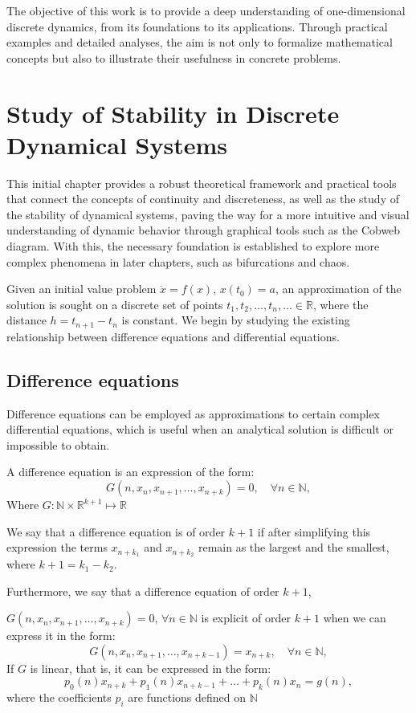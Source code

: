 \documentclass[12pt,a4paper]{report}
\theoremstyle{definition}
\begin{document}
The objective of this work is to provide a deep understanding of one-dimensional discrete dynamics, from its foundations to its applications. Through practical examples and detailed analyses, the aim is not only to formalize mathematical concepts but also to illustrate their usefulness in concrete problems.

\chapter{Study of Stability in Discrete Dynamical Systems}\label{chap:dinamica_discreta}

This initial chapter provides a robust theoretical framework and practical tools that connect the concepts of continuity and discreteness, as well as the study of the stability of dynamical systems, paving the way for a more intuitive and visual understanding of dynamic behavior through graphical tools such as the Cobweb diagram. With this, the necessary foundation is established to explore more complex phenomena in later chapters, such as bifurcations and chaos.

Given an initial value problem \(\dot{x} = f(x)\), \(x(t_0) = a\), an approximation of the solution is sought on a discrete set of points \(t_1, t_2, \ldots, t_n, \ldots \in \mathbb{R}\), where the distance \(h = t_{n+1} - t_n\) is constant. We begin by studying the existing relationship between difference equations and differential equations. 

\section{Difference equations}
 
Difference equations can be employed as approximations to certain complex differential equations, which is useful when an analytical solution is difficult or impossible to obtain.

A difference equation is an expression of the form:
\[
G(n, x_n,x_{n+1}, \ldots, x_{n+k}) = 0, \quad \forall n \in \mathbb{N},
\]
%
Where  $G:\mathbb{N} \times \mathbb{R}^{k+1}  \mapsto \mathbb{R}$ 

We say that a difference equation is of order $k+1$ if after simplifying this expression the terms 
\( x_{n+k_1} \) and \( x_{n+k_2} \) remain as the largest and the smallest, where \( k +1= k_1 - k_2 \).

Furthermore, we say that a difference equation of order $k+1$,  

$G(n, x_n,x_{n+1}, \ldots, x_{n+k}) = 0, \, \forall n \in \mathbb{N}$ is explicit of order $k+1$ when we can express it in the form: 
\[
G(n, x_n,x_{n+1}, \ldots, x_{n+k-1}) = x_{n+k}, \quad \forall n \in \mathbb{N},
\]
%
If $G$ is linear, that is, it can be expressed in the form:
\[
p_0(n)x_{n+k} + p_1(n)x_{n+k-1} + \dots + p_k(n)x_{n} = g(n),
\]
where the coefficients \( p_i \) are functions defined on \( \mathbb{N} \)
\end{document}
